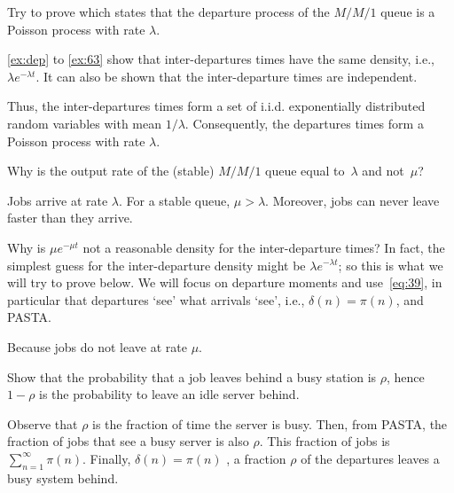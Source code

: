 \begin{exercise}\label{ex:burke}
  Try to prove  which states that the departure process of the $M/M/1$ queue is a Poisson process with rate $\lambda$.
\begin{solution}
  \cref{ex:dep} to \cref{ex:63} show that inter-departures times have the same density, i.e., $\lambda e^{-\lambda t}$.
  It can also be shown that the inter-departure times are independent.

Thus, the inter-departures times form a set of i.i.d.
exponentially distributed random variables with mean $1/\lambda$.
Consequently, the departures times form a Poisson process with rate $\lambda$.

\end{solution}
\end{exercise}



\begin{extra}\label{ex:dep}
Why is the output rate of the (stable) $M/M/1$ queue equal to~$\lambda$ and not~$\mu$?
\begin{solution}
Jobs arrive at rate $\lambda$. For a stable queue, $\mu>\lambda$. Moreover,  jobs can never leave faster than they arrive.
\end{solution}
\end{extra}


\begin{extra}
  Why is $\mu e^{-\mu t}$ not a reasonable density for the inter-departure times?
  In fact, the simplest guess for the inter-departure density might be $\lambda e^{-\lambda t}$; so this is what we will try to prove below.
We will focus on departure moments and use~\cref{eq:39}, in particular that departures `see' what arrivals `see', i.e., $\delta(n)= \pi(n)$, and PASTA.
\begin{solution}
         Because jobs do not leave at rate $\mu$. 
    \end{solution}
\end{extra}




\begin{extra}\label{ex:28}
Show that the probability that a job leaves behind a busy station is $\rho$, hence $1-\rho$ is the probability to leave an idle server behind.
    \begin{solution}
Observe that $\rho$ is the fraction of time the server is busy. Then, from  PASTA, the fraction of jobs that see a busy server is also $\rho$.  This fraction of jobs is $\sum_{n=1}^\infty \pi(n)$. Finally, $\delta(n) = \pi(n)$ , a fraction $\rho$ of the departures leaves a busy system behind.

    \end{solution}
\end{extra}


